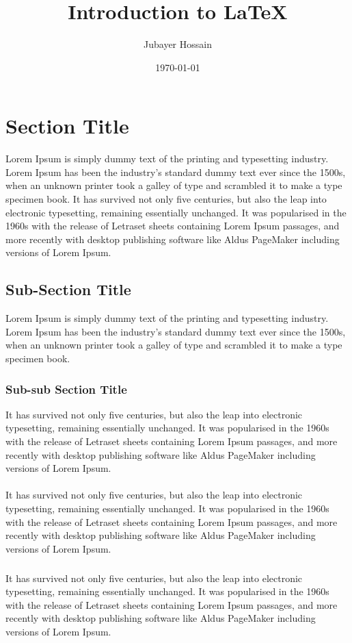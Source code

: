 \documentclass{article}
\title{Introduction to {\LaTeX}}
\author{Jubayer Hossain}
\date{\today}
\begin{document}
\maketitle 
\tableofcontents 

\section{Section Title} 
Lorem Ipsum is simply dummy text of the printing and typesetting industry. 
Lorem Ipsum has been the industry's standard dummy text ever since the 1500s, 
when an unknown printer took a galley of type and scrambled it to make a type 
specimen book. It has survived not only five centuries, but also the leap into 
electronic typesetting, remaining essentially unchanged. It was popularised in 
the 1960s with the release of Letraset sheets containing Lorem Ipsum passages, 
and more recently with desktop publishing software like Aldus PageMaker 
including versions of Lorem Ipsum.

\subsection{Sub-Section Title}
Lorem Ipsum is simply dummy text of the printing and typesetting industry. 
Lorem Ipsum has been the industry's standard dummy text ever since the 1500s, 
when an unknown printer took a galley of type and scrambled it to make a type 
specimen book. 

\subsubsection{Sub-sub Section Title}
It has survived not only five centuries, but also the leap into electronic 
typesetting, remaining essentially unchanged. It was popularised in the 1960s 
with the release of Letraset sheets containing Lorem Ipsum passages, and more 
recently with desktop publishing software like Aldus PageMaker including 
versions of Lorem Ipsum.

\paragraph{}
It has survived not only five centuries, but also the leap into electronic 
typesetting, remaining essentially unchanged. It was popularised in the 1960s 
with the release of Letraset sheets containing Lorem Ipsum passages, and more 
recently with desktop publishing software like Aldus PageMaker including 
versions of Lorem Ipsum.

\subparagraph{}
It has survived not only five centuries, but also the leap into electronic 
typesetting, remaining essentially unchanged. It was popularised in the 1960s 
with the release of Letraset sheets containing Lorem Ipsum passages, and more 
recently with desktop publishing software like Aldus PageMaker including 
versions of Lorem Ipsum. 
\end{document}
